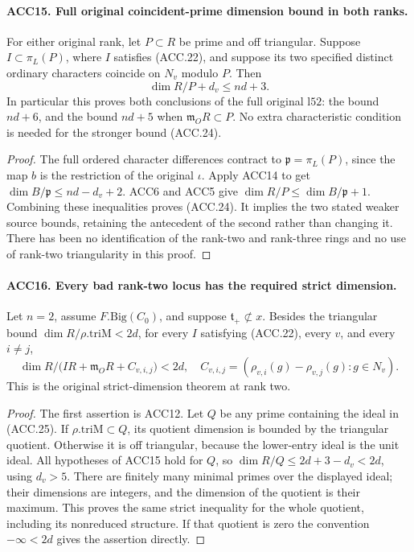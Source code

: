 \documentclass[11pt,a4paper]{article}
\numberwithin{equation}{section}
\theoremstyle{remark}\newtheorem{remark}[theorem]{Remark}
\begin{document}
\paragraph{ACC15. Full original coincident-prime dimension bound in both ranks.}
\label{claim:ACC15}
For either original rank, let \(P\subset R\) be prime and
off triangular.  Suppose \(I\subset\pi_L(P)\), where \(I\)
satisfies (ACC.22), and suppose its two specified distinct ordinary
characters coincide on \(N_v\) modulo \(P\).  Then
\[
                            \dim R/P+d_v\le nd+3.         \tag{ACC.24}
\]
In particular this proves both conclusions of the full original
\(\mathrm{l52}\): the bound \(nd+6\), and the bound \(nd+5\)
when \(\mathfrak m_O R\subset P\).  No extra characteristic
condition is needed for the stronger bound (ACC.24).

\begin{proof}
The full ordered character differences contract to
\(\mathfrak p=\pi_L(P)\), since the map \(b\) is the
restriction of the original \(\iota\).  Apply ACC14 to get
\(\dim B/\mathfrak p\le nd-d_v+2\).  ACC6 and ACC5 give
\(\dim R/P\le\dim B/\mathfrak p+1\).  Combining these
inequalities proves (ACC.24).  It implies the two stated weaker
source bounds, retaining the antecedent of the second rather than
changing it.  There has been no identification of the rank-two and
rank-three rings and no use of rank-two triangularity in this proof.
\end{proof}

\paragraph{ACC16. Every bad rank-two locus has the required strict dimension.}
\label{claim:ACC16}
Let \(n=2\), assume \(F.\mathrm{Big}(C_0)\), and suppose
\(\mathfrak t_+\not\subset x\).  Besides the triangular
bound \(\dim R/\rho.\mathrm{triM}<2d\), for every \(I\)
satisfying (ACC.22), every \(v\), and every \(i\ne j\),
\[
 \dim R/\bigl(IR+\mathfrak m_O R+C_{v,i,j}\bigr)<2d,
 \quad
 C_{v,i,j}=(\rho_{v,i}(g)-\rho_{v,j}(g):g\in N_v).
                                                               \tag{ACC.25}
\]
This is the original strict-dimension theorem at rank two.

\begin{proof}
The first assertion is ACC12.  Let \(Q\) be any prime containing
the ideal in (ACC.25).  If \(\rho.\mathrm{triM}\subset Q\),
its quotient dimension is bounded by the triangular quotient.
Otherwise it is off triangular, because the lower-entry ideal is
the unit ideal.  All hypotheses of ACC15 hold for \(Q\), so
\(\dim R/Q\le2d+3-d_v<2d\), using \(d_v>5\).
There are finitely many minimal primes over the displayed ideal;
their dimensions are integers, and the dimension of the quotient is
their maximum.  This proves the same strict inequality for the whole
quotient, including its nonreduced structure.  If that quotient is
zero the convention \(-\infty<2d\) gives the assertion directly.
\end{proof}
\end{document}
